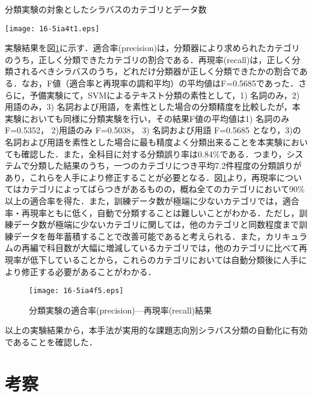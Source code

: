 \documentclass[japanese]{jnlp_1.4}
\begin{document}
\begin{table}[t]
\caption{分類実験の対象としたシラバスのカテゴリとデータ数}
\label{table:category_data}
\begin{center}
\texttt{[image: 16-5ia4t1.eps]}
\end{center}
\end{table}

実験結果を図\ref{fig:svm_result}に示す．適合率(precision)は，分類器により求められたカテゴリのうち，正しく分類できたカテゴリの割合である．再現率(recall)は，正しく分類されるべきシラバスのうち，どれだけ分類器が正しく分類できたかの割合である．なお，F値（適合率と再現率の調和平均）の平均値はF=0.5685であった．さらに，予備実験にて，SVMによるテキスト分類の素性として，1) 名詞のみ，2)用語のみ，3) 名詞および用語，を素性とした場合の分類精度を比較したが，本実験においても同様に分類実験を行い，その結果F値の平均値は1) 名詞のみ F=0.5352， 2)用語のみ F=0.5038， 3) 名詞および用語 F=0.5685 となり，3)の名詞および用語を素性とした場合に最も精度よく分類出来ることを本実験においても確認した．また，全科目に対する分類誤り率は0.84\%である．つまり，システムで分類した結果のうち，一つのカテゴリにつき平均7.2件程度の分類誤りがあり，これらを人手により修正することが必要となる．図\ref{fig:svm_result}より，再現率についてはカテゴリによってばらつきがあるものの，概ね全てのカテゴリにおいて90\%以上の適合率を得た．また，訓練データ数が極端に少ないカテゴリでは，適合率・再現率ともに低く，自動で分類することは難しいことがわかる．ただし，訓練データ数が極端に少ないカテゴリに関しては，他のカテゴリと同数程度まで訓練データを毎年蓄積することで改善可能であると考えられる．また，カリキュラムの再編で科目数が大幅に増減しているカテゴリでは，他のカテゴリに比べて再現率が低下していることから，これらのカテゴリにおいては自動分類後に人手により修正する必要があることがわかる．

\begin{figure}[t]
\begin{center}
\texttt{[image: 16-5ia4f5.eps]}
\end{center}
\caption{分類実験の適合率(precision)—再現率(recall)結果}
\label{fig:svm_result}
\end{figure}

以上の実験結果から，本手法が実用的な課題志向別シラバス分類の自動化に有効であることを確認した．


\section{考察}
\end{document}
